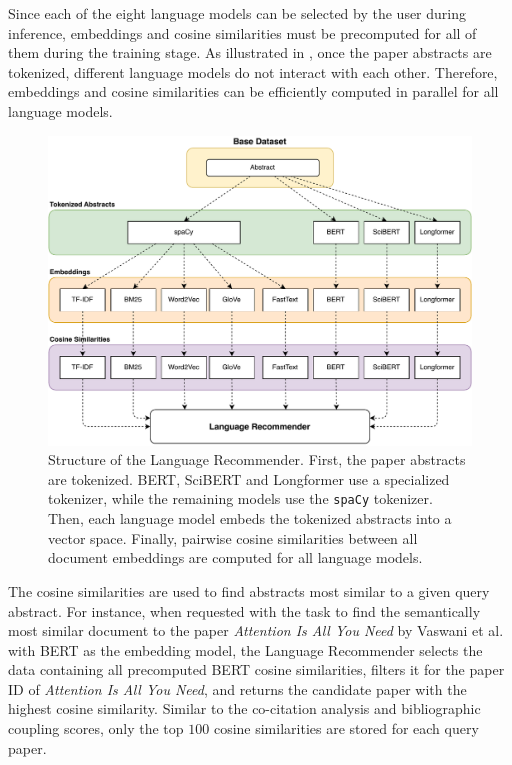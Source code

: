 Since each of the eight language models can be selected by the user during inference, embeddings and cosine similarities must be precomputed for all of them during the training stage.
As illustrated in , once the paper abstracts are tokenized, different language models do not interact with each other.
Therefore, embeddings and cosine similarities can be efficiently computed in parallel for all language models.

\begin{figure}[htb!]
    \centering
    \includegraphics[width=\textwidth]{diagrams/language_recommender.pdf}
    \caption[Language Recommender]{Structure of the Language Recommender.
        First, the paper abstracts are tokenized. BERT, SciBERT and Longformer use a specialized tokenizer, while the remaining models use the \texttt{spaCy} \cite{HonnibalImprovedNonmonotonic2015} tokenizer. Then, each language model embeds the tokenized abstracts into a vector space. Finally, pairwise cosine similarities between all document embeddings are computed for all language models.}
    \label{fig:language-recommender}
\end{figure}

The cosine similarities are used to find abstracts most similar to a given query abstract.
For instance, when requested with the task to find the semantically most similar document to the paper \emph{Attention Is All You Need} by Vaswani et al. \cite{VaswaniAttentionAll2017} with BERT as the embedding model, the Language Recommender selects the data containing all precomputed BERT cosine similarities, filters it for the paper ID of \emph{Attention Is All You Need}, and returns the candidate paper with the highest cosine similarity.
Similar to the co-citation analysis and bibliographic coupling scores, only the top $100$ cosine similarities are stored for each query paper.

